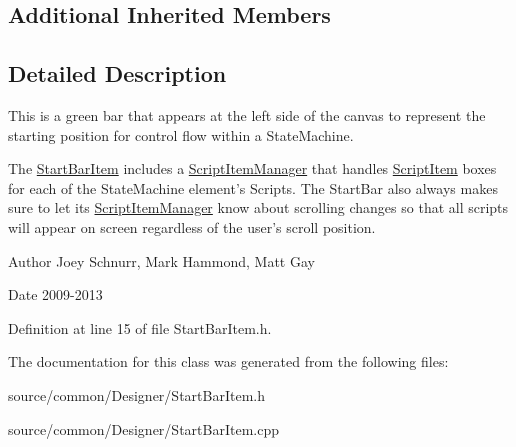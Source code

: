 \subsection*{Additional Inherited Members}


\subsection{Detailed Description}
This is a green bar that appears at the left side of the canvas to represent the starting position for control flow within a State\-Machine. 

The \hyperlink{class_start_bar_item}{Start\-Bar\-Item} includes a \hyperlink{class_script_item_manager}{Script\-Item\-Manager} that handles \hyperlink{class_script_item}{Script\-Item} boxes for each of the State\-Machine element's Scripts. The Start\-Bar also always makes sure to let its \hyperlink{class_script_item_manager}{Script\-Item\-Manager} know about scrolling changes so that all scripts will appear on screen regardless of the user's scroll position. \begin{DoxyAuthor}{Author}
Joey Schnurr, Mark Hammond, Matt Gay 
\end{DoxyAuthor}
\begin{DoxyDate}{Date}
2009-\/2013 
\end{DoxyDate}


Definition at line 15 of file Start\-Bar\-Item.\-h.



The documentation for this class was generated from the following files\-:\begin{DoxyCompactItemize}
\item 
source/common/\-Designer/Start\-Bar\-Item.\-h\item 
source/common/\-Designer/Start\-Bar\-Item.\-cpp\end{DoxyCompactItemize}
